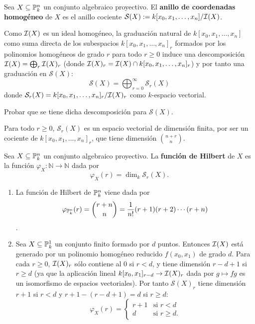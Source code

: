 \documentclass[ACGA.tex]{subfiles}
\begin{document}
\begin{defi}
 Sea $X\subseteq\mathbb{P}^n_k$ un conjunto algebraico proyectivo. El {\bf anillo de coordenadas homogéneo} de $X$ es el anillo cociente ${\mathcal S}(X):=k[x_0,x_1,\ldots,x_n]/\mathcal{I}(X)$.
\end{defi}

Como $\mathcal{I}(X)$ es un ideal homogéneo, la graduación natural de $k[x_0,x_1,\ldots,x_n]$ como suma directa de los subespacios $k[x_0,x_1,\ldots,x_n]_r$ formados por los polinomios homogéneos de grado $r$ para todo $r\geq 0$ induce una descomposición $\mathcal{I}(X)=\bigoplus_r\mathcal{I}(X)_r$ (donde $\mathcal{I}(X)_r=\mathcal{I}(X)\cap k[x_0,x_1,\ldots,x_n]_r$) y por tanto una graduación en ${\mathcal S}(X)$:
$$
{\mathcal S}(X)=\bigoplus_{r=0}^{\infty}{\mathcal S}_r(X)
$$
donde ${\mathcal S}_r(X)=k[x_0,x_1,\ldots,x_n]_r/\mathcal{I}(X)_r$ como $k$-espacio vectorial.

\begin{ejer}
 Probar que se tiene dicha descomposición para ${\mathcal S}(X)$.
\end{ejer}

Para todo $r\geq 0$, ${\mathcal S}_r(X)$ es un espacio vectorial de dimensión finita, por ser un cociente de $k[x_0,x_1,\ldots,x_n]_r$, que tiene dimensión ${{n+r}\choose n}$.

\begin{defi}
 Sea $X\subseteq\mathbb{P}^n_k$ un conjunto algebraico proyectivo. La {\bf función de Hilbert} de $X$ es la función $\varphi_X:{\mathbb N}\to{\mathbb N}$ dada por
$$
\varphi_X(r)=\dim_k{\mathcal S}_r(X).
$$
\end{defi}

\begin{ejs}\label{hilbert}
\begin{enumerate}
        \item La función de Hilbert de $\mathbb{P}^n_k$ viene dada por $$\varphi_{\mathbb{P}^n_k}(r)={{r+n}\choose n}=\frac{1}{n!}(r+1)(r+2)\cdots(r+n)$$.
\item Sea $X\subseteq\mathbb{P}^1_k$ un conjunto finito formado por $d$ puntos. Entonces $\mathcal{I}(X)$ está generado por un polinomio homogéneo reducido $f(x_0,x_1)$ de grado $d$. Para cada $r\geq 0$, $\mathcal{I}(X)_r$ sólo contiene al $0$ si $r<d$, y tiene dimensión $r-d+1$ si $r\geq d$ (ya que la aplicación lineal $k[x_0,x_1]_{r-d}\to\mathcal{I}(X)_r$ dada por $g\mapsto fg$ es un isomorfismo de espacios vectoriales). Por tanto ${\mathcal S}(X)_r$ tiene dimensión $r+1$ si $r<d$ y $r+1-(r-d+1)=d$ si $r\geq d$:
$$
\varphi_X(r)=\left\{\begin{array}{ll}
                     r+1 & \text{si }r<d \\
                     d & \text{si }r\geq d.
                    \end{array}\right.
$$

\end{enumerate}
\end{ejs}
\end{document}
